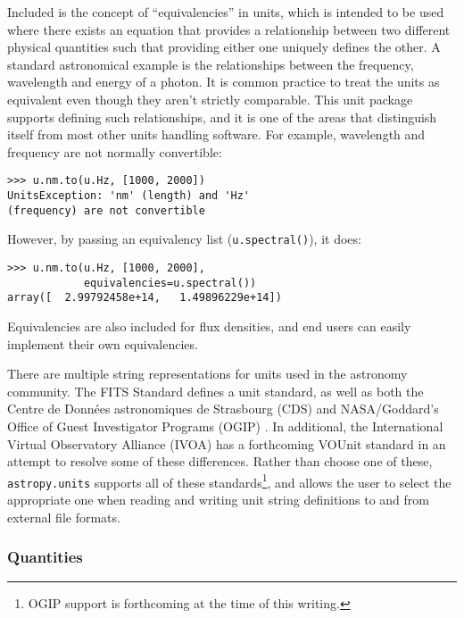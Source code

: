 \documentclass[traditabstract]{aa}
\begin{document}
Included is the concept of ``equivalencies'' in units, which is intended to be
used where there exists an equation that provides a relationship between two
different physical quantities such that providing either one uniquely defines
the other. A standard astronomical example is the relationships between the
frequency, wavelength and energy of a photon. It is common practice to treat
the units as equivalent even though they aren't strictly comparable. This unit
package supports defining such relationships, and it is one of the areas that
distinguish itself from most other units handling software. For example,
wavelength and frequency are not normally convertible:
\begin{verbatim}
>>> u.nm.to(u.Hz, [1000, 2000])
UnitsException: 'nm' (length) and 'Hz'
(frequency) are not convertible
\end{verbatim}
However, by passing an equivalency list (\texttt{u.spectral()}), it
does:
\begin{verbatim}
>>> u.nm.to(u.Hz, [1000, 2000],
            equivalencies=u.spectral())
array([  2.99792458e+14,   1.49896229e+14])
\end{verbatim}
Equivalencies are also included for flux densities, and end users can
easily implement their own equivalencies.


There are multiple string representations for
units used in the astronomy community.  The FITS Standard
\cite{fits2008} defines a unit standard, as well as both the Centre de
Donn\'ees astronomiques de Strasbourg (CDS) \citep{ochsenbein2000cds}
and NASA/Goddard's Office of Guest Investigator Programs (OGIP)
\citep{george1995ogip}.  In additional, the International Virtual
Observatory Alliance (IVOA) has a forthcoming VOUnit standard
\citep{derriere2012vounit} in an attempt to resolve some of these
differences.  Rather than choose one of these, \texttt{astropy.units}
supports all of these standards\footnote{OGIP support is forthcoming
  at the time of this writing.}, and allows the user to select the
appropriate one when reading and writing unit string definitions to
and from external file formats.

\subsubsection{Quantities}
\end{document}
